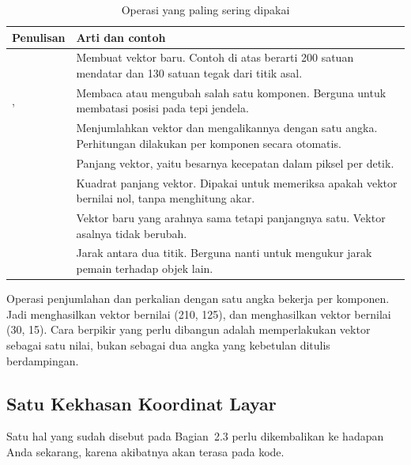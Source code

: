\begin{table}[htbp]
\centering
\caption{Operasi  yang paling sering dipakai}
\label{tab:operasi-vector2}
{\setlength{\tabcolsep}{4pt}\footnotesize%
\begin{tabularx}{\textwidth}{@{}L{5.2cm} Y@{}}
\toprule
\headrow \textbf{Penulisan} & \textbf{Arti dan contoh} \\
\midrule
{} &
Membuat vektor baru. Contoh di atas berarti 200 satuan mendatar dan 130 satuan
tegak dari titik asal. \\
\addlinespace
{},  &
Membaca atau mengubah salah satu komponen. Berguna untuk membatasi posisi pada
tepi jendela. \\
\addlinespace
{} &
Menjumlahkan vektor dan mengalikannya dengan satu angka. Perhitungan dilakukan
per komponen secara otomatis. \\
\addlinespace
{} &
Panjang vektor, yaitu besarnya kecepatan dalam piksel per detik. \\
\addlinespace
{} &
Kuadrat panjang vektor. Dipakai untuk memeriksa apakah vektor bernilai nol,
tanpa menghitung akar. \\
\addlinespace
{} &
Vektor baru yang arahnya sama tetapi panjangnya satu. Vektor asalnya tidak
berubah. \\
\addlinespace
{} &
Jarak antara dua titik. Berguna nanti untuk mengukur jarak pemain terhadap
objek lain. \\
\bottomrule
\end{tabularx}}
\end{table}

Operasi penjumlahan dan perkalian dengan satu angka bekerja per komponen. Jadi
 menghasilkan vektor
bernilai (210, 125), dan  menghasilkan vektor
bernilai (30, 15). Cara berpikir yang perlu dibangun adalah memperlakukan
vektor sebagai satu nilai, bukan sebagai dua angka yang kebetulan ditulis
berdampingan.

\subsection{Satu Kekhasan Koordinat Layar}

Satu hal yang sudah disebut pada Bagian~2.3 perlu dikembalikan ke hadapan Anda
sekarang, karena akibatnya akan terasa pada kode.

